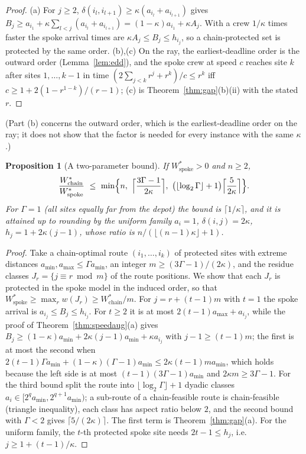 \documentclass[pdflatex,sn-mathphys-ay]{sn-jnl}
\theoremstyle{thmstyleone}
\newtheorem{proposition}[theorem]{Proposition}
\theoremstyle{thmstyletwo}
\theoremstyle{thmstylethree}
\begin{document}
\begin{proof}
(a) For $j\ge2$, $\delta(i_l,i_{l+1})\ge\kappa(a_{i_l}+a_{i_{l+1}})$ gives
$B_j\ge a_{i_1}+\kappa\sum_{l<j}(a_{i_l}+a_{i_{l+1}})=(1-\kappa)a_{i_1}+\kappa A_j$.
With a crew $1/\kappa$ times faster the spoke arrival times are
$\kappa A_j\le B_j\le h_{i_j}$, so a chain-protected set is protected by the
same order. (b),(c) On the ray, the earliest-deadline order is the outward
order (Lemma~\ref{lem:edd}), and the spoke crew at speed $c$ reaches site
$k$ after sites $1,\dots,k-1$ in time $(2\sum_{j<k}r^j+r^k)/c\le r^k$ iff
$c\ge1+2(1-r^{1-k})/(r-1)$; (c) is Theorem~\ref{thm:gap}(b)(ii) with the
stated $r$. \end{proof}

(Part (b) concerns the outward order, which is the earliest-deadline order
on the ray; it does not show that the factor is needed for every instance
with the same $\kappa$.)

\begin{proposition}[A two-parameter bound]\label{prop:twopar}
If $W^\ast_{\mathrm{spoke}}>0$ and $n\ge2$,
\[
\frac{W^\ast_{\mathrm{chain}}}{W^\ast_{\mathrm{spoke}}}\ \le\ \min\Bigl\{n,\ \Bigl\lceil\frac{3\Gamma-1}{2\kappa}\Bigr\rceil,\ \bigl(\lfloor\log_2\Gamma\rfloor+1\bigr)\Bigl\lceil\frac{5}{2\kappa}\Bigr\rceil\Bigr\}.
\]
For $\Gamma=1$ (all sites equally far from the depot) the bound is
$\lceil1/\kappa\rceil$, and it is attained up to rounding by the
\emph{uniform} family $a_i=1$, $\delta(i,j)=2\kappa$, $h_j=1+2\kappa(j-1)$,
whose ratio is $n/(\lfloor(n-1)\kappa\rfloor+1)$.
\end{proposition}

\begin{proof}
Take a chain-optimal route $(i_1,\dots,i_k)$ of protected sites with
extreme distances $a_{\min},a_{\max}\le\Gamma a_{\min}$, an integer
$m\ge(3\Gamma-1)/(2\kappa)$, and the residue classes
$J_r=\{j\equiv r\bmod m\}$ of the route positions. We show that each $J_r$
is protected in the spoke model in the induced order, so that
$W^\ast_{\mathrm{spoke}}\ge\max_rw(J_r)\ge W^\ast_{\mathrm{chain}}/m$. For
$j=r+(t-1)m$ with $t=1$ the spoke arrival is $a_{i_j}\le B_j\le h_{i_j}$.
For $t\ge2$ it is at most $2(t-1)a_{\max}+a_{i_j}$, while the proof of
Theorem~\ref{thm:speedaug}(a) gives
$B_j\ge(1-\kappa)a_{\min}+2\kappa(j-1)a_{\min}+\kappa a_{i_j}$ with
$j-1\ge(t-1)m$; the first is at most the second when
$2(t-1)\Gamma a_{\min}+(1-\kappa)(\Gamma-1)a_{\min}\le2\kappa(t-1)ma_{\min}$,
which holds because the left side is at most $(t-1)(3\Gamma-1)a_{\min}$ and
$2\kappa m\ge3\Gamma-1$. For the third bound split the route into
$\lfloor\log_2\Gamma\rfloor+1$ dyadic classes $a_i\in[2^qa_{\min},2^{q+1}a_{\min})$;
a sub-route of a chain-feasible route is chain-feasible (triangle
inequality), each class has aspect ratio below $2$, and the second bound
with $\Gamma<2$ gives $\lceil5/(2\kappa)\rceil$. The first term is
Theorem~\ref{thm:gap}(a). For the uniform family, the $t$-th protected
spoke site needs $2t-1\le h_j$, i.e.\ $j\ge1+(t-1)/\kappa$.
\end{proof}
\end{document}
